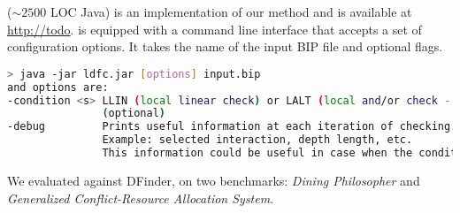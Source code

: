 %
\deadlocktool{} ($\sim 2500$ LOC Java) is an implementation of our method and is available at 
\href{http://todo}{http://todo}. 
%
\deadlocktool{} is equipped with a command line interface that accepts a set 
of configuration options. 
It takes the name of the input BIP file and optional flags. 
\begin{lstlisting}[language=Bash]
> java -jar ldfc.jar [options] input.bip 
and options are:
-condition <s> LLIN (local linear check) or LALT (local and/or check - default)
               (optional)
-debug         Prints useful information at each iteration of checking. 
               Example: selected interaction, depth length, etc.
               This information could be useful in case when the condition fails.
\end{lstlisting}

We evaluated \deadlocktool{} against DFinder, on two benchmarks: {\em Dining Philosopher} and {\em Generalized Conflict-Resource Allocation System}.